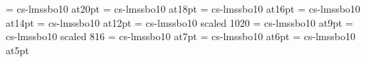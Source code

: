 \font\twentyslbf=      cs-lmssbo10 at20pt
\font\eighteenslbf=    cs-lmssbo10 at18pt
\font\sixteenslbf=     cs-lmssbo10 at16pt
\font\fourteenslbf=    cs-lmssbo10 at14pt
\font\twelveslbf=      cs-lmssbo10 at12pt
\font\slbf=            cs-lmssbo10 scaled 1020       \slbf=3pt
\font\nineslbf=        cs-lmssbo10 at9pt
\font\eightslbf=       cs-lmssbo10 scaled 816       \eightslbf=2.5pt
\font\sevenslbf=       cs-lmssbo10 at7pt
\font\sixslbf=         cs-lmssbo10 at6pt
\font\fiveslbf=        cs-lmssbo10 at5pt


\rm 